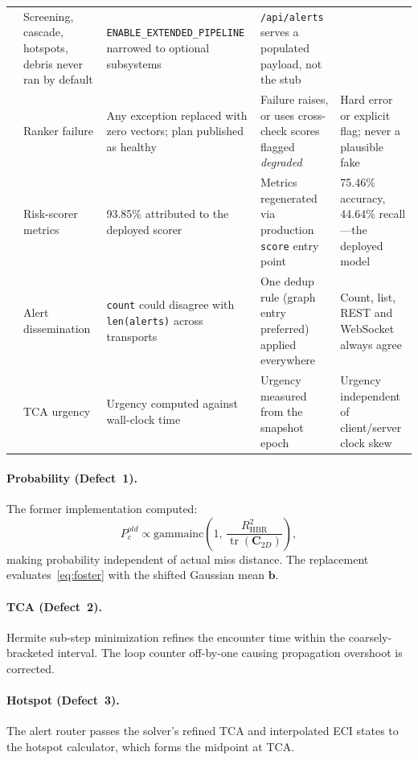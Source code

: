 \documentclass[conference]{IEEEtran}
\newcommand{\bvec}[1]{\mathbf{#1}}
\newcommand{\Pc}{P_c}
\newcommand{\RHBR}{R_{\mathrm{HBR}}}
\DeclareMathOperator{\tr}{tr}
\begin{document}
\begin{table}[t]
\begin{tabular}{@{}clp{3.1cm}p{3.4cm}p{3.1cm}@{}}
  & Screening, cascade, hotspots, debris never ran by default
  & \texttt{ENABLE\_EXTENDED\_PIPELINE} narrowed to optional subsystems
  & \texttt{/api/alerts} serves a populated payload, not the stub \\
\addlinespace
8 & Ranker failure
  & Any exception replaced with zero vectors; plan published as healthy
  & Failure raises, or uses cross-check scores flagged \emph{degraded}
  & Hard error or explicit flag; never a plausible fake \\
\addlinespace
9 & Risk-scorer metrics
  & 93.85\% attributed to the deployed scorer
  & Metrics regenerated via production \texttt{score} entry point
  & 75.46\% accuracy, 44.64\% recall---the deployed model \\
\addlinespace
10 & Alert dissemination
  & \texttt{count} could disagree with \texttt{len(alerts)} across transports
  & One dedup rule (graph entry preferred) applied everywhere
  & Count, list, REST and WebSocket always agree \\
\addlinespace
11 & TCA urgency
  & Urgency computed against wall-clock time
  & Urgency measured from the snapshot epoch
  & Urgency independent of client/server clock skew \\
\bottomrule
\end{tabular}
\end{table}

\paragraph{Probability (Defect~1).}
The former implementation computed:
\begin{equation}
  \Pc^{old} \propto \mathrm{gammainc}\!\left(1,\,
    \frac{\RHBR^2}{\tr(\bvec{C}_{2D})}\right),
\end{equation}
making probability independent of actual miss distance. The replacement
evaluates~\eqref{eq:foster} with the shifted Gaussian mean $\bvec{b}$.

\paragraph{TCA (Defect~2).}
Hermite sub-step minimization refines the encounter time within the
coarsely-bracketed interval. The loop counter off-by-one causing propagation
overshoot is corrected.

\paragraph{Hotspot (Defect~3).}
The alert router passes the solver's refined TCA and interpolated ECI states
to the hotspot calculator, which forms the midpoint at TCA.
\end{document}
